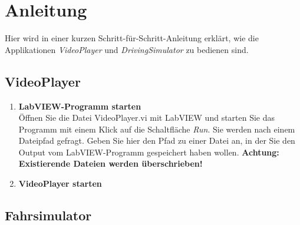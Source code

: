 \section{Anleitung}
Hier wird in einer kurzen Schritt-für-Schritt-Anleitung erklärt, wie die Applikationen \textit{VideoPlayer} und \textit{DrivingSimulator} zu bedienen sind.
\subsection{VideoPlayer}
\begin{enumerate}[label=\arabic*.]

\item \textbf{LabVIEW-Programm starten}\\
Öffnen Sie die Datei VideoPlayer.vi mit LabVIEW und starten Sie das Programm mit einem Klick auf die Schaltfläche \textit{Run}. Sie werden nach einem Dateipfad gefragt. Geben Sie hier den Pfad zu einer Datei an, in der Sie den Output vom LabVIEW-Programm gespeichert haben wollen. \textbf{Achtung: Existierende Dateien werden überschrieben!}
	
	\item \textbf{VideoPlayer starten}
\end{enumerate}
\subsection{Fahrsimulator}
